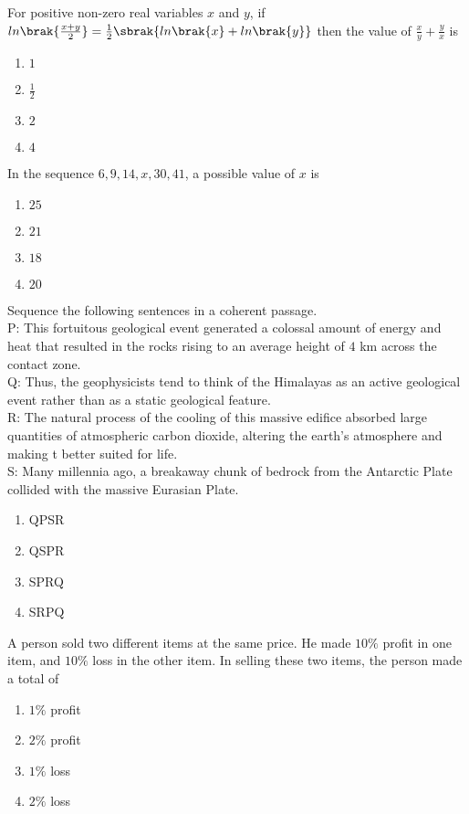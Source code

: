 \item{
For positive non-zero real variables $x$ and $y$, if $ln\brak{\frac{x+y}{2}}=\frac{1}{2}\sbrak{ln\brak{x}+ln\brak{y}}$ then the value of $\frac{x}{y}+\frac{y}{x}$ is
\begin{multicols}{4}
\begin{enumerate}
\item $1$
\item $\frac{1}{2}$
\item $2$
\item $4$
\end{enumerate}
\end{multicols}
}
\item{
In the sequence $6,9,14,x,30,41$, a possible value of $x$ is
\begin{multicols}{4}
\begin{enumerate}
\item $25$
\item $21$
\item $18$
\item $20$
\end{enumerate}
\end{multicols}
}
\item{
Sequence the following sentences in a coherent passage.\\
P: This fortuitous geological event generated a colossal amount of energy and heat that resulted in the rocks rising to an average height of $4$ km across the contact zone.\\
Q: Thus, the geophysicists tend to think of the Himalayas as an active geological event rather than as a static geological feature.\\
R: The natural process of the cooling of this massive edifice absorbed large quantities of atmospheric carbon dioxide, altering the earth's atmosphere and making t better suited for life.\\
S: Many millennia ago, a breakaway chunk of bedrock from the Antarctic Plate collided with the massive Eurasian Plate.\\
\begin{multicols}{4}
\begin{enumerate}
\item QPSR
\item QSPR
\item SPRQ
\item SRPQ
\end{enumerate}
\end{multicols}
}
\item{
A person sold two different items at the same price. He made $10\%$ profit in one item, and $10\%$ loss in the other item. In selling these two items, the person made a total of
\begin{multicols}{4}
\begin{enumerate}
\item $1\%$ profit
\item $2\%$ profit
\item $1\%$ loss
\item $2\%$ loss
\end{enumerate}
\end{multicols}
}
